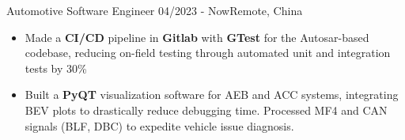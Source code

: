 \resumeSubheadingReza
{Automotive Software Engineer}{}
{04/2023 - Now}{Remote, China}
{
  \vspace{-12pt}
  \begin{itemize}
    \item {Made a \textbf{CI/CD} pipeline in \textbf{Gitlab} with \textbf{GTest} for the Autosar-based codebase, reducing on-field testing through automated unit and integration tests by 30\%}
    \item {Built a \textbf{PyQT} visualization software for AEB and ACC systems, integrating BEV plots to drastically reduce debugging time. Processed MF4 and CAN signals (BLF, DBC) to expedite vehicle issue diagnosis.}
  \end{itemize}
}




